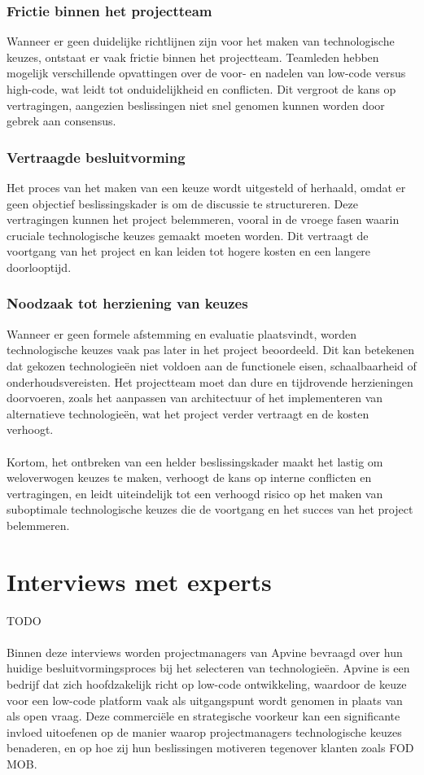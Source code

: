 \subsubsection{Frictie binnen het projectteam}
Wanneer er geen duidelijke richtlijnen zijn voor het maken van technologische keuzes, ontstaat er vaak frictie binnen het projectteam. Teamleden hebben mogelijk verschillende opvattingen over de voor- en nadelen van low-code versus high-code, wat leidt tot onduidelijkheid en conflicten. Dit vergroot de kans op vertragingen, aangezien beslissingen niet snel genomen kunnen worden door gebrek aan consensus.
\subsubsection{Vertraagde besluitvorming}
Het proces van het maken van een keuze wordt uitgesteld of herhaald, omdat er geen objectief beslissingskader is om de discussie te structureren. Deze vertragingen kunnen het project belemmeren, vooral in de vroege fasen waarin cruciale technologische keuzes gemaakt moeten worden. Dit vertraagt de voortgang van het project en kan leiden tot hogere kosten en een langere doorlooptijd.
\subsubsection{Noodzaak tot herziening van keuzes}
Wanneer er geen formele afstemming en evaluatie plaatsvindt, worden technologische keuzes vaak pas later in het project beoordeeld. Dit kan betekenen dat gekozen technologieën niet voldoen aan de functionele eisen, schaalbaarheid of onderhoudsvereisten. Het projectteam moet dan dure en tijdrovende herzieningen doorvoeren, zoals het aanpassen van architectuur of het implementeren van alternatieve technologieën, wat het project verder vertraagt en de kosten verhoogt.
\\
\\
Kortom, het ontbreken van een helder beslissingskader maakt het lastig om weloverwogen keuzes te maken, verhoogt de kans op interne conflicten en vertragingen, en leidt uiteindelijk tot een verhoogd risico op het maken van suboptimale technologische keuzes die de voortgang en het succes van het project belemmeren.

\section{Interviews met experts}
TODO
\\
\\
Binnen deze interviews worden projectmanagers van Apvine bevraagd over hun huidige besluitvormingsproces bij het selecteren van technologieën. Apvine is een bedrijf dat zich hoofdzakelijk richt op low-code ontwikkeling, waardoor de keuze voor een low-code platform vaak als uitgangspunt wordt genomen in plaats van als open vraag. Deze commerciële en strategische voorkeur kan een significante invloed uitoefenen op de manier waarop projectmanagers technologische keuzes benaderen, en op hoe zij hun beslissingen motiveren tegenover klanten zoals \gls{FOD MOB}.

